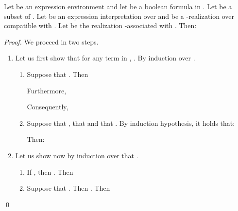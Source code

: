 \documentclass[a4paper]{llncs}
\begin{document}
    \begin{lemma}\label{lem r assoc egal r pour phi}
    Let  be an expression environment and let  be a boolean formula in . Let  be a subset of . Let  be an expression interpretation over  and  be a -realization over  compatible with . Let  be the realization -associated with . Then:
    
  \end{lemma}
  \begin{proof}
    We proceed in two steps.
    \begin{enumerate}
    \item\label{p1} Let us first show that for any term  in , .
    By induction over .
    \begin{enumerate}
      \item Suppose that .
        Then 
        
        
        Furthermore,
                
        Consequently,
        
      \item Suppose that , that  and that  . 
      By induction hypothesis, it holds that:
        
        Then:
        
    \end{enumerate}    
    \item Let us show now by induction over  that .    
    \begin{enumerate}
      \item If , then .
        Then
        
      \item Suppose that .
        Then .
        Then   
        
    \end{enumerate}
    \end{enumerate}    
    \qed
  \end{proof}
  
\end{document}
